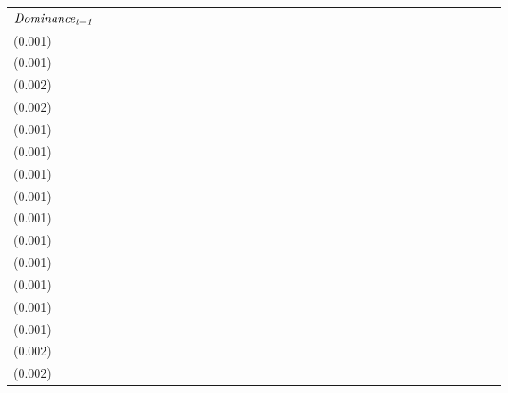 \begin{tabular}{lllllllllllllllllllllllllllllllll}
$\it Dominance_{t-1}$        &                                     &                                     &                                     &                                     &   \makecell{$0.946^{**}$ \\(0.001)} &   \makecell{$0.946^{**}$ \\(0.001)} &   \makecell{$0.834^{**}$ \\(0.002)} &   \makecell{$0.835^{**}$ \\(0.002)} &                                     &                                     &                                     &                                     &   \makecell{$0.973^{**}$ \\(0.001)} &   \makecell{$0.973^{**}$ \\(0.001)} &   \makecell{$0.967^{**}$ \\(0.001)} &   \makecell{$0.967^{**}$ \\(0.001)} &                                     &                                     &                                     &                                     &   \makecell{$0.974^{**}$ \\(0.001)} &   \makecell{$0.974^{**}$ \\(0.001)} &   \makecell{$0.960^{**}$ \\(0.001)} &   \makecell{$0.960^{**}$ \\(0.001)} &                                     &                                     &                                     &                                    &  \makecell{$0.964^{**}$ \\(0.001)} &  \makecell{$0.964^{**}$ \\(0.001)} &  \makecell{$0.899^{**}$ \\(0.002)} &  \makecell{$0.899^{**}$ \\(0.002)} \\

\end{tabular}
